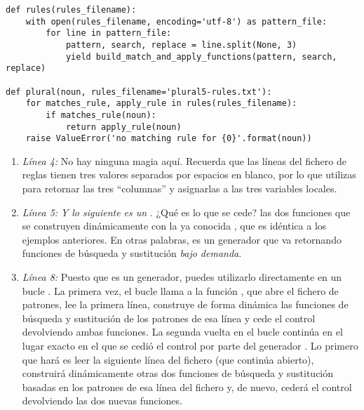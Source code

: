 \noindent\begin{minipage}{\textwidth}
\begin{lstlisting}[mathescape=True]
def rules(rules_filename):
    with open(rules_filename, encoding='utf-8') as pattern_file:
        for line in pattern_file:
            pattern, search, replace = line.split(None, 3)
            yield build_match_and_apply_functions(pattern, search, replace)

def plural(noun, rules_filename='plural5-rules.txt'):
    for matches_rule, apply_rule in rules(rules_filename):
        if matches_rule(noun):
            return apply_rule(noun)
    raise ValueError('no matching rule for {0}'.format(noun))
\end{lstlisting}
\end{minipage}

\begin{enumerate}

\item \emph{Línea 4:} No hay ninguna magia aquí. Recuerda que las líneas del fichero de reglas tienen tres valores separados por espacios en blanco, por lo que utilizas  para retornar las tres ``columnas'' y asignarlas a las tres variables locales.

\item \emph{Línea 5:} \emph{Y lo siguiente es un }. ¿Qué es lo que se cede? las dos funciones que se construyen dinámicamente con la ya conocida , que es idéntica a los ejemplos anteriores. En otras palabras,  es un generador que va retornando funciones de búsqueda y sustitución \emph{bajo demanda}.

\item \emph{Línea 8:} Puesto que  es un generador, puedes utilizarlo directamente en un bucle . La primera vez, el bucle  llama a la función , que abre el fichero de patrones, lee la primera línea, construye de forma dinámica las funciones de búsqueda y sustitución de los patrones de esa línea y cede el control devolviendo ambas funciones. La segunda vuelta en el bucle  continúa en el lugar exacto en el que se cedió el control por parte del generador . Lo primero que hará es leer la siguiente línea del fichero (que continúa abierto), construirá dinámicamente otras dos funciones de búsqueda y sustitución basadas en los patrones de esa línea del fichero y, de nuevo, cederá el control devolviendo las dos nuevas funciones.

\end{enumerate}

